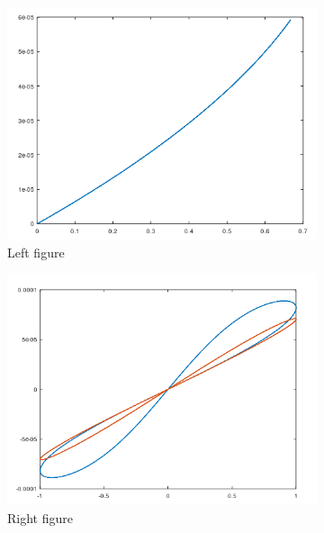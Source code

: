 \documentclass{ceel}
\begin{document}
\begin{multicols}{2}
\begin{figure}[H]
\begin{subfigure}{0.49\columnwidth}
\centering
\includegraphics[width=\columnwidth]{flux-charge}
\caption{Left figure} \label{fig:left}
\end{subfigure}
\hfill
\begin{subfigure}{0.49\columnwidth}
\centering
\includegraphics[width=\columnwidth]{pinched-hysteresis-loop}
\caption{Right figure} \label{fig:right}
\end{subfigure}

\caption{}\label{}
\end{figure}





\end{multicols}
\end{document}
